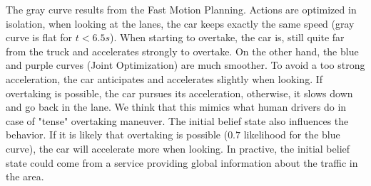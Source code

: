 \documentclass[conference]{IEEEtran}
\begin{document}
The gray curve results from the Fast Motion Planning. Actions are optimized in isolation, when looking at the lanes, the car keeps exactly the same speed (gray curve is flat for $t<6.5s$). When starting to overtake, the car is, still quite far from the truck and accelerates strongly to overtake. On the other hand, the blue and purple curves (Joint Optimization) are much smoother. To avoid a too strong acceleration, the car anticipates and accelerates slightly when looking. If overtaking is possible, the car pursues its acceleration, otherwise, it slows down and go back in the lane. We think that this mimics what human drivers do in case of "tense" overtaking maneuver. The initial belief state also influences the behavior. If it is likely that overtaking is possible ($0.7$ likelihood for the blue curve), the car will accelerate more when looking. In practive, the initial belief state could come from a service providing global information about the traffic in the area.
\end{document}
